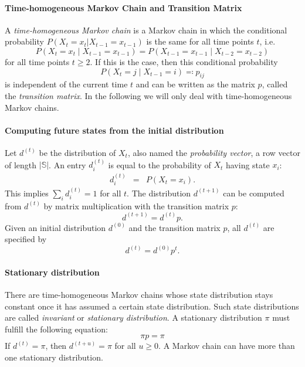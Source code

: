 \paragraph{Time-homogeneous Markov Chain and Transition Matrix}

A \emph{time-homogeneous Markov chain}
is a Markov chain in which the conditional probability $P(X_{t}=x_{t}|X_{t-1}=x_{t-1})$
is the same for all time points $t$, i.e. 
\[
P(X_{t}=x_{t}\mid X_{t-1}=x_{t-1})=P(X_{t-1}=x_{t-1}\mid X_{t-2}=x_{t-2})
\]
for all time points $t\geq2$. If this is the case, then this conditional
probability 
\[
P(X_{t}=j\mid X_{t-1}=i)\eqqcolon p_{ij}
\]
 is independent of the current time $t$ and can be written as the
matrix $p$, called the \emph{transition matrix}.
In the following we will only deal with time-homogeneous Markov chains.

\paragraph{Computing future states from the initial distribution}

Let $d^{(t)}$ be the distribution of $X_{t}$, also named the \emph{probability
vector}, a row vector of length $|\mathbb{S}|$.
An entry $d_{i}^{(t)}$ is equal to the probability of $X_{t}$ having
state $x_{i}$: 
\begin{eqnarray*}
d_{i}^{(t)} & = & P(X_{t}=x_{i}).
\end{eqnarray*}
This implies $\sum_{i}d_{i}^{(t)}=1$ for all $t$. The distribution
$d^{(t+1)}$ can be computed from $d^{(t)}$ by matrix multiplication
with the transition matrix $p$: 
\[
d^{(t+1)}=d^{(t)}p.
\]
Given an initial distribution $d^{(0)}$ and the transition matrix
$p$, all $d^{(t)}$ are specified by 
\[
d^{(t)}=d^{(0)}p^{t}.
\]

\paragraph{Stationary distribution}

There are time-homogeneous Markov chains whose state distribution
stays constant once it has assumed a certain state distribution. Such
state distributions are called \emph{invariant}
or \emph{stationary distribution}.
A stationary distribution $\pi$ must fulfill the following equation:
\[
\pi p=\pi
\]
If $d^{(t)}=\pi$, then $d^{(t+u)}=\pi$ for all $u\geq0$. A Markov
chain can have more than one stationary distribution.

